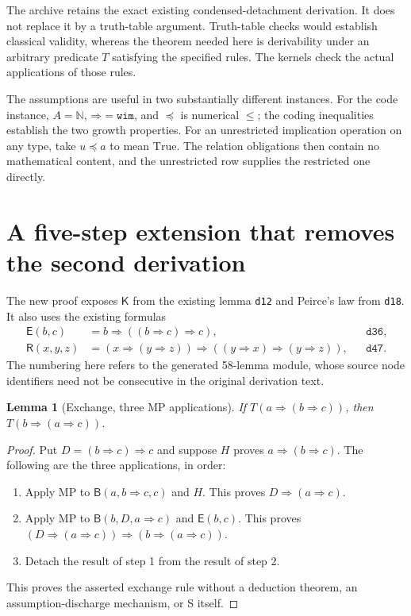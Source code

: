 \documentclass[11pt,letterpaper]{article}
\newtheorem{lemma}[theorem]{Lemma}
\newcommand{\Imp}{\mathbin{\Rightarrow}}
\newcommand{\Prv}[1]{T(#1)}
\begin{document}
The archive retains the exact existing condensed-detachment derivation. It
does not replace it by a truth-table argument. Truth-table checks would establish
classical validity, whereas the theorem needed here is derivability under an
arbitrary predicate $T$ satisfying the specified rules. The kernels check the
actual applications of those rules.

The assumptions are useful in two substantially different instances. For the
code instance, $A=\mathbb N$, $\Imp=\texttt{wim}$, and $\preceq$ is numerical
$\leq$; the coding inequalities establish the two growth properties. For an
unrestricted implication operation on any type, take $u\preceq a$ to mean
$\mathrm{True}$. The relation obligations then contain no mathematical content,
and the unrestricted row supplies the restricted one directly.

\section{A five-step extension that removes the second derivation}

The new proof exposes $\mathsf K$ from the existing lemma \texttt{d12} and Peirce's
law from \texttt{d18}. It also uses the existing formulas
\begin{align*}
 \mathsf E(b,c)&=b\Imp((b\Imp c)\Imp c), &&\texttt{d36},\\
 \mathsf R(x,y,z)&=(x\Imp(y\Imp z))\Imp((y\Imp x)\Imp(y\Imp z)),
 &&\texttt{d47}.
\end{align*}
The numbering here refers to the generated 58-lemma module, whose source node
identifiers need not be consecutive in the original derivation text.

\begin{lemma}[Exchange, three MP applications]\label{lem:exchange}
If $\Prv{a\Imp(b\Imp c)}$, then $\Prv{b\Imp(a\Imp c)}$.
\end{lemma}
\begin{proof}
Put $D=(b\Imp c)\Imp c$ and suppose $H$ proves $a\Imp(b\Imp c)$.
The following are the three applications, in order:
\begin{enumerate}
\item Apply MP to $\mathsf B(a,b\Imp c,c)$ and $H$. This proves
$D\Imp(a\Imp c)$.
\item Apply MP to $\mathsf B(b,D,a\Imp c)$ and $\mathsf E(b,c)$.
This proves $(D\Imp(a\Imp c))\Imp(b\Imp(a\Imp c))$.
\item Detach the result of step 1 from the result of step 2.
\end{enumerate}
This proves the asserted exchange rule without a deduction theorem, an
assumption-discharge mechanism, or S itself.
\end{proof}
\end{document}
